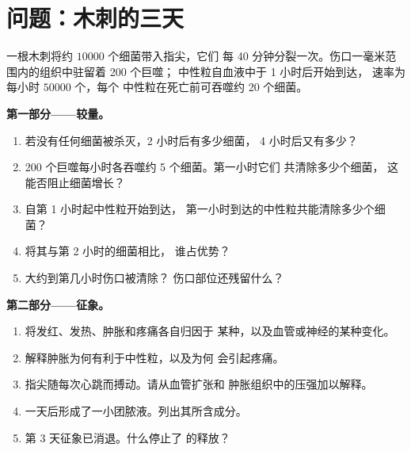 \section{问题：木刺的三天}

\begin{problem}
\label{pb:g12:innate-immunity:1}
一根木刺将约 $\num{10000}$ 个细菌带入指尖，它们
每 40 分钟分裂一次。伤口一毫米范围内的组织中驻留着 200 个巨噬；
中性粒自血液中于 1 小时后开始到达，
速率为每小时 $\num{50000}$ 个，每个
中性粒在死亡前可吞噬约 20 个细菌。

\medskip
\noindent\textbf{第一部分——较量。}
\begin{enumerate}
  \item 若没有任何细菌被杀灭，2 小时后有多少细菌，
        4 小时后又有多少？
  \item 200 个巨噬每小时各吞噬约 5 个细菌。第一小时它们
        共清除多少个细菌，
        这能否阻止细菌增长？
  \item 自第 1 小时起中性粒开始到达，
        第一小时到达的中性粒共能清除多少个细菌？
  \item 将其与第 2 小时的细菌相比，
        谁占优势？
  \item 大约到第几小时伤口被清除？
        伤口部位还残留什么？
\end{enumerate}

\medskip
\noindent\textbf{第二部分——征象。}
\begin{enumerate}[resume]
  \item 将发红、发热、肿胀和疼痛各自归因于
        某种，以及血管或神经的某种变化。
  \item 解释肿胀为何有利于中性粒，以及为何
        会引起疼痛。
  \item 指尖随每次心跳而搏动。请从血管扩张和
        肿胀组织中的压强加以解释。
  \item 一天后形成了一小团脓液。列出其所含成分。
  \item 第 3 天征象已消退。什么停止了
        的释放？
\end{enumerate}


\end{problem}
